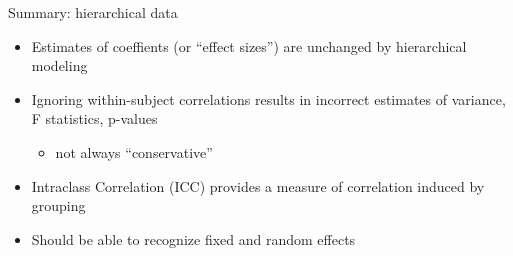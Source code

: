 \documentclass[
  ignorenonframetext,
]{beamer}
\providecommand{\tightlist}{%
  \setlength{\itemsep}{0pt}\setlength{\parskip}{0pt}}
\begin{document}
\begin{frame}{Summary: hierarchical data}
\protect\hypertarget{summary-hierarchical-data}{}

\begin{itemize}
\tightlist
\item
  Estimates of coeffients (or ``effect sizes'') are unchanged by
  hierarchical modeling
\item
  Ignoring within-subject correlations results in incorrect estimates of
  variance, F statistics, p-values

  \begin{itemize}
  \tightlist
  \item
    not always ``conservative''
  \end{itemize}
\item
  Intraclass Correlation (ICC) provides a measure of correlation induced
  by grouping
\item
  Should be able to recognize fixed and random effects
\end{itemize}

\end{frame}
\end{document}
